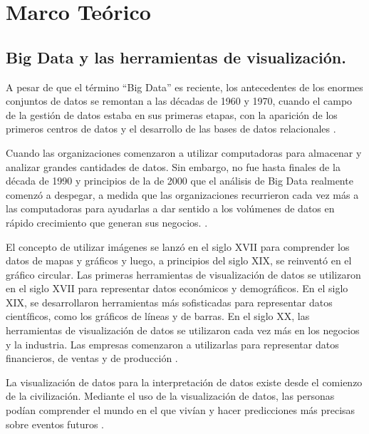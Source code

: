 \documentclass[
  11pt,
  bookmarksnumbered]{article}
\begin{document}
\hypertarget{marco-teuxf3rico}{%
\section{\texorpdfstring{\textbf{Marco Teórico}}{Marco Teórico}}\label{marco-teuxf3rico}}

\hypertarget{big-data-y-las-herramientas-de-visualizaciuxf3n.}{%
\subsection{Big Data y las herramientas de visualización.}\label{big-data-y-las-herramientas-de-visualizaciuxf3n.}}

A pesar de que el término ``Big Data'' es reciente, los antecedentes de los enormes conjuntos de datos se remontan a las décadas de 1960 y 1970, cuando el campo de la gestión de datos estaba en sus primeras etapas, con la aparición de los primeros centros de datos y el desarrollo de las bases de datos relacionales \textcite{oracle2023big}.

Cuando las organizaciones comenzaron a utilizar computadoras para almacenar y analizar grandes cantidades de datos.
Sin embargo, no fue hasta finales de la década de 1990 y principios de la de 2000 que el análisis de Big Data realmente comenzó a despegar, a medida que las organizaciones recurrieron cada vez más a las computadoras para ayudarlas a dar sentido a los volúmenes de datos en rápido crecimiento que generan sus negocios.
\textcite{simplilearn2023big}.

El concepto de utilizar imágenes se lanzó en el siglo XVII para comprender los datos de mapas y gráficos y luego, a principios del siglo XIX, se reinventó en el gráfico circular.
\textcite{javatpoint2023data} Las primeras herramientas de visualización de datos se utilizaron en el siglo XVII para representar datos económicos y demográficos.
En el siglo XIX, se desarrollaron herramientas más sofisticadas para representar datos científicos, como los gráficos de líneas y de barras.
En el siglo XX, las herramientas de visualización de datos se utilizaron cada vez más en los negocios y la industria.
Las empresas comenzaron a utilizarlas para representar datos financieros, de ventas y de producción \textcite{wainer2022origins}.

La visualización de datos para la interpretación de datos existe desde el comienzo de la civilización.
Mediante el uso de la visualización de datos, las personas podían comprender el mundo en el que vivían y hacer predicciones más precisas sobre eventos futuros \textcite{helical2023data}.
\end{document}
